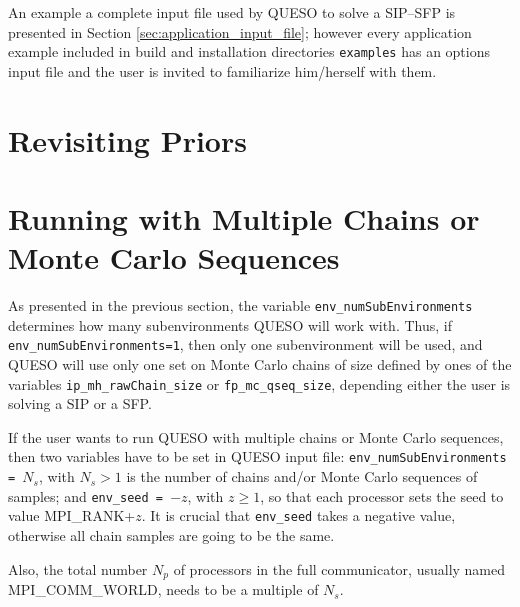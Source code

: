 An example a complete input file used by QUESO to solve a SIP--SFP is presented in Section \ref{sec:application_input_file}; however every application example included in \Queso{} build and installation directories \verb+examples+ has an options input file and the user is invited to familiarize him/herself with them.



\section{Revisiting Priors}

\section{Running with Multiple Chains or Monte Carlo Sequences}

\new{}\vspace{-30pt}
\begin{leftbar}
 
As presented in the previous section, the variable \verb+env_numSubEnvironments+ determines how many subenvironments QUESO will work with. Thus, if \verb+env_numSubEnvironments=1+, then   only one subenvironment will be used, and QUESO will use only one set on Monte Carlo chains of size defined by ones of the variables \verb+ip_mh_rawChain_size+ or \verb+fp_mc_qseq_size+, depending either the user is solving a SIP or a SFP.

If the user wants to run QUESO with multiple chains or Monte Carlo sequences, then two variables have to be set in QUESO input file: \verb+env_numSubEnvironments = +$N_s$, with $N_s>1$ is the number of chains and/or Monte Carlo sequences of samples; and \verb+env_seed = +$-z$, with $z\geqslant 1$, so that each processor sets the seed to value MPI\_RANK+$z$.
It is crucial that \verb+env_seed+ takes a negative value, otherwise all chain samples are going to be the same.

Also, the total number $N_p$ of processors in the full communicator, usually named \linebreak MPI\_COMM\_WORLD, needs to be a multiple of $N_s$.
\end{leftbar}



